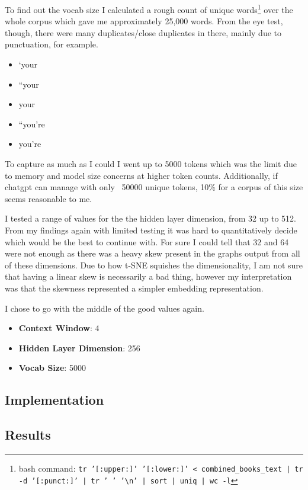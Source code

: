 \documentclass[12pt]{article} \usepackage{COSC420style} \usepackage{soul}
\begin{document}
To find out the vocab size I calculated a rough count of unique words\footnote{bash command:
\texttt{tr '[:upper:]' '[:lower:]' < combined\_books\_text | tr -d '[:punct:]' | tr ' '
'\textbackslash{}n' | sort | uniq | wc -l}} over the whole corpus which gave me approximately 25,000
words. From the eye test, though, there were many duplicates/close duplicates in there, mainly due
to punctuation, for example.

\begin{itemize}
	\item   ‘your
	\item   “your
	\item   your
	\item   “you’re
	\item   you’re
\end{itemize}

To capture as much as I could I went up to 5000 tokens which was the limit due to memory and model
size concerns at higher token counts. Additionally, if chatgpt can manage with only ~50000 unique
tokens, 10\% for a corpus of this size seems reasonable to me.

I tested a range of values for the the hidden layer dimension, from 32 up to 512. From my findings
again with limited testing it was hard to quantitatively decide which would be the best to continue
with. For sure I could tell that 32 and 64 were not enough as there was a heavy skew present in the
graphs output from all of these dimensions. Due to how t-SNE squishes the dimensionality, I am not
sure that having a linear skew is necessarily a bad thing, however my interpretation was that the
skewness represented a simpler embedding representation.

I chose to go with the middle of the good values again.

\begin{itemize}
	\item \textbf{Context Window}: 4
	\item \textbf{Hidden Layer Dimension}: 256
	\item \textbf{Vocab Size}: 5000
\end{itemize}

\subsection{Implementation}

\subsection{Results}
\end{document}
